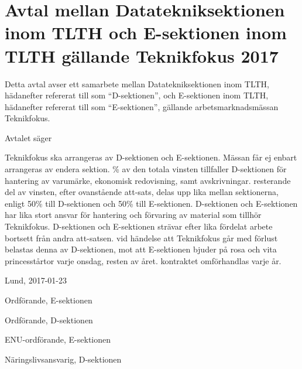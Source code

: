 \documentclass[10pt]{article}
\def\tfdate{2017}
\def\doctitle{Avtal mellan Datatekniksektionen inom TLTH och E-sektionen inom TLTH gällande Teknikfokus {\tfdate}}
\def\date{2017-01-23} %
\begin{document}
    \section*{\doctitle}
    Detta avtal avser ett samarbete mellan Datatekniksektionen inom TLTH, hädanefter refererat till som ``D-sektionen'', och E-sektionen inom TLTH, hädanefter refererat till som ``E-sektionen'', gällande arbetsmarknadsmässan Teknikfokus.

    Avtalet säger
    \begin{attsatser}
        \att Teknikfokus ska arrangeras av D-sektionen och E-sektionen. Mässan får ej enbart arrangeras av endera sektion.
        \% av den totala vinsten tillfaller D-sektionen för hantering av varumärke, ekonomisk redovisning, samt avskrivningar.
        \att resterande del av vinsten, efter ovanstående att-sats, delas upp lika mellan sektionerna, enligt 50\% till D-sektionen och 50\% till E-sektionen.
        \att D-sektionen och E-sektionen har lika stort ansvar för hantering och förvaring av material som tillhör Teknikfokus.
        \att D-sektionen och E-sektionen strävar efter lika fördelat arbete bortsett från andra att-satsen.
        \att vid händelse att Teknikfokus går med förlust belastas denna av D-sektionen, mot att E-sektionen bjuder på rosa och vita princesstårtor varje onsdag, resten av året.
        \att kontraktet omförhandlas varje år.
    \end{attsatser}

    \begin{signatures}{4}
        Lund, \date
        \signature{Erik Månsson}{Ordförande, E-sektionen}
        \signature{Axel Isberg}{Ordförande, D-sektionen}
        \signature{Josefine Sandström}{ENU-ordförande, E-sektionen}
        \signature{Rasmus Göransson}{Näringslivsansvarig, D-sektionen}
    \end{signatures}
\end{document}
